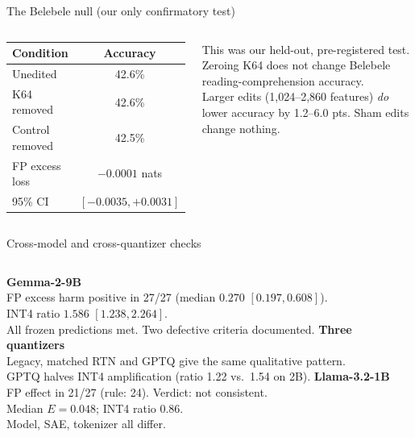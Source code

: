 \documentclass[aspectratio=169,11pt]{beamer}
\newcommand{\takeaway}[1]{\par\vspace{3pt}{\large #1}\par}
\newcommand{\aside}[1]{{\small\color{muted}#1}}
\begin{document}
\begin{frame}{The Belebele null (our only confirmatory test)}
\begin{columns}[c]
\centering
\small
\begin{tabular}{lc}
\toprule
\textbf{Condition} & \textbf{Accuracy}\\
\midrule
Unedited & 42.6\%\\
K64 removed & 42.6\%\\
Control removed & 42.5\%\\
\midrule
FP excess loss & $-0.0001$ nats\\
95\% CI & $[-0.0035, +0.0031]$\\
\bottomrule
\end{tabular}
This was our \alert{held-out, pre-registered} test.\\[4pt]
Zeroing K64 does not change Belebele reading-comprehension accuracy.\\[4pt]
Larger edits (1,024--2,860 features) \emph{do} lower accuracy by 1.2--6.0 pts. Sham edits change nothing.
\end{columns}
\vspace{4pt}
\takeaway{The groups help next-token prediction but have no detectable effect on this comprehension task.}
\end{frame}

\begin{frame}{Cross-model and cross-quantizer checks}
\begin{columns}[T]
\textbf{\color{blue}Gemma-2-9B}\\[3pt]
\small
FP excess harm positive in \alert{27/27} (median $0.270$ $[0.197, 0.608]$).\\[3pt]
INT4 ratio $1.586$ $[1.238, 2.264]$.\\[3pt]
All frozen predictions met. Two defective criteria documented.
\textbf{\color{blue}Three quantizers}\\[3pt]
\small
Legacy, matched RTN and GPTQ give the \alert{same qualitative pattern}.\\[3pt]
GPTQ halves INT4 amplification (ratio 1.22 vs.\ 1.54 on 2B).
\textbf{\color{blue}Llama-3.2-1B}\\[3pt]
\small
FP effect in 21/27 (rule: 24). Verdict: \alert{not consistent}.\\[3pt]
Median $E = 0.048$; INT4 ratio 0.86.\\[3pt]
\aside{Model, SAE, tokenizer all differ.}
\end{columns}
\end{frame}
\end{document}
